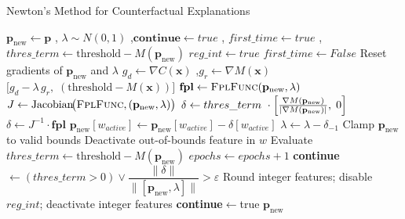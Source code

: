 \documentclass[12pt]{extarticle}
\numberwithin{equation}{section}
\begin{document}
\begin{algorithm}
    \caption{Newton's Method for Counterfactual Explanations}
\label{alg:newton_counterfactual}
\begin{algorithmic}[1]
     {} 
    \State $\mathbf{p}_{\text{new}} \gets \mathbf{p}$
    ,\; $\lambda \sim N(0, 1)$
    ,\;$\mathbf{continue} \gets true$
    ,\; $first\_time \gets true$
    ,\; $thres\_term \gets \text{threshold} - M(\mathbf{p}_{\text{new}})$
         
            \State $reg\_int \gets true$
            \State $first\_time \gets False$
        \EndIf
        \State Reset gradients of $\mathbf{p}_{\text{new}}$ and $\lambda$
         {}
            \State $g_{d} \gets \nabla C(\mathbf{x})$
            ,\;$g_{r} \gets \nabla M(\mathbf{x})$
            \State \Return $\bigl[g_{d}-\lambda\,g_{r},\;(\text{threshold}-M(\mathbf{x}))\bigr]$
        \EndFunction
        \State $\mathbf{fpl} \gets \textsc{FplFunc}(\mathbf{p}_{\text{new}},\lambda)$
        \State $J \gets \text{Jacobian}\!\bigl(\textsc{FplFunc},
                            (\mathbf{p}_{\text{new}},\lambda)\bigr)$
        \label{lst:line_norm} 
            \State $\delta \gets thres\_term\ \cdot
                    \Bigl[\frac{\nabla M(\mathbf{p}_{\text{new}})}{|\nabla M(\mathbf{p}_{\text{new}})|},\;0\Bigr]$
        \Else
            \State $\delta \gets J^{-1} \cdot \mathbf{fpl}$ 
        \EndIf
        \State $\mathbf{p}_{\text{new}}[w_{active}] \gets 
                \mathbf{p}_{\text{new}}[w_{active}]- \delta[w_{active}] $
        \State $\lambda \gets \lambda - \delta_{-1}$
            \State Clamp $\mathbf{p}_{\text{new}}$ to valid bounds 
            \State Deactivate out-of-bounds feature in $w$
        \EndIf
        \State Evaluate $thres\_term \gets \text{threshold}-M(\mathbf{p}_{\text{new}})$
        \State $epochs \gets epochs+1$
        \State \textbf{continue} $\gets (thres\_term>0)\lor
                \dfrac{\lVert\delta\rVert}{\lVert[\mathbf{p}_{\text{new}},\lambda]\rVert}>\varepsilon$
            \State Round integer features;\; disable $reg\_int$;\; deactivate integer features
            \State \textbf{continue}$\gets$true
        \EndIf
    \EndWhile
    \State \Return $\mathbf{p}_{\text{new}}$
    \EndFunction
\end{algorithmic}
\end{algorithm}
\end{document}
